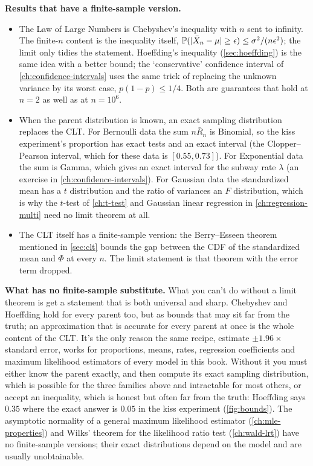 \textbf{Results that have a finite-sample version.}
\begin{itemize}
\item The Law of Large Numbers is Chebyshev's inequality with $n$ sent to infinity.
The finite-$n$ content is the inequality itself, $\mathbb{P}(\lvert\bar{X}_n - \mu\rvert \geq \epsilon) \leq \sigma^2/(n\epsilon^2)$; the limit only tidies the statement.
Hoeffding's inequality (\cref{sec:hoeffding}) is the same idea with a better bound; the `conservative' confidence interval of \cref{ch:confidence-intervals} uses the same trick of replacing the unknown variance by its worst case, $p(1-p) \leq 1/4$.
Both are guarantees that hold at $n = 2$ as well as at $n = 10^6$.
\item When the parent distribution is known, an exact sampling distribution replaces the CLT.
For Bernoulli data the sum $n\bar{R}_n$ is Binomial, so the kiss experiment's proportion has exact tests and an exact interval (the Clopper--Pearson interval, which for these data is $[0.55, 0.73]$).
For Exponential data the sum is Gamma, which gives an exact interval for the subway rate $\lambda$ (an exercise in \cref{ch:confidence-intervals}).
For Gaussian data the standardized mean has a $t$ distribution and the ratio of variances an $F$ distribution, which is why the $t$-test of \cref{ch:t-test} and Gaussian linear regression in \cref{ch:regression-multi} need no limit theorem at all.
\item The CLT itself has a finite-sample version: the Berry--Esseen theorem mentioned in \cref{sec:clt} bounds the gap between the CDF of the standardized mean and $\Phi$ at every $n$.
The limit statement is that theorem with the error term dropped.
\end{itemize}

\textbf{What has no finite-sample substitute.}
What you can't do without a limit theorem is get a statement that is both universal and sharp.
Chebyshev and Hoeffding hold for every parent too, but as bounds that may sit far from the truth; an approximation that is accurate for every parent at once is the whole content of the CLT.
It's the only reason the same recipe, estimate $\pm 1.96 \times$ standard error, works for proportions, means, rates, regression coefficients and maximum likelihood estimators of every model in this book.
Without it you must either know the parent exactly, and then compute its exact sampling distribution, which is possible for the three families above and intractable for most others, or accept an inequality, which is honest but often far from the truth: Hoeffding says $0.35$ where the exact answer is $0.05$ in the kiss experiment (\cref{fig:bounds}).
The asymptotic normality of a general maximum likelihood estimator (\cref{ch:mle-properties}) and Wilks' theorem for the likelihood ratio test (\cref{ch:wald-lrt}) have no finite-sample versions; their exact distributions depend on the model and are usually unobtainable.

